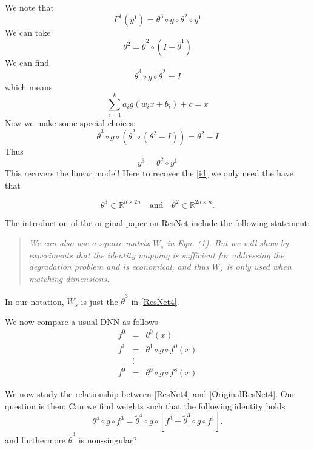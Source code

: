 \begin{enumerate}
We note that
$$
F^1(y^1)=\theta^3\circ g\circ \theta^2\circ y^1
$$
We can take 
$$
\theta^2=\check \theta^2\circ (I-\hat\theta^1)
$$
We can find 
$$
\bar\theta^3\circ g\circ \bar\theta^2 = I
$$
which means
$$
\sum_{i=1}^k a_ig(w_ix+b_i)+c =x
$$
Now we make some special choices:
\begin{equation}\label{id}
\bar\theta^3\circ g\circ (\bar\theta^2\circ(\theta^2-I)) = \theta^2-I
\end{equation}
Thus
$$
y^3=\theta^2\circ y^1
$$
This recovers the linear model! Here to recover the \eqref{id} we only need the have that 

\begin{equation}\label{id_cond}
\theta^3 \in \mathbb{R}^{n\times 2n} \quad \text{and} \quad \theta^2 \in \mathbb{R}^{2n \times n}.
\end{equation}

\newpage

The introduction of the original paper on ResNet \cite{HeKaiming2015} include the following statement:
\begin{quote}\it
  We can also use a square matrix $W_s$ in Eqn. (1). But we will show by experiments that the identity mapping is sufficient for addressing the degradation problem and is economical, and thus $W_s$ is only used when matching dimensions. 
\end{quote}
In our notation, $W_s$ is just the $\tilde\theta^3$ in \eqref{ResNet4}.

We now compare a usual DNN as follows
\begin{equation}\label{OriginalResNet4}
  \begin{array}{rcl}
f^0&=&\theta^0(x)\\    
f^1&=&\theta^1\circ g\circ f^0(x)\\    
&\vdots& \\        
f^9&=&\theta^9\circ g\circ f^8(x)
  \end{array}
\end{equation}
\end{enumerate}

We now study the relationship between \eqref{ResNet4} and \eqref{OriginalResNet4}.  Our question is then: Can we find weights such that the following identity holds
\begin{equation}
\label{ResNet4}
\theta^4\circ g\circ f^3=\tilde \theta^4\circ g\circ[f^3+\tilde \theta^3\circ g\circ f^1].    
\end{equation}
and furthermore $\tilde \theta^3$ is non-singular? 

